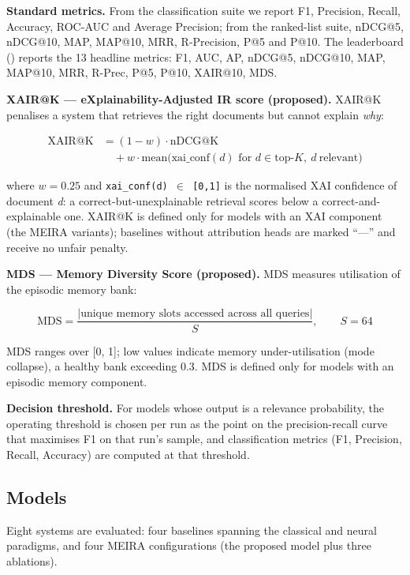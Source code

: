\textbf{Standard metrics.} From the classification suite we report F1, Precision, Recall, Accuracy, ROC-AUC and Average Precision; from the ranked-list suite, nDCG@5, nDCG@10, MAP, MAP@10, MRR, R-Precision, P@5 and P@10. The leaderboard () reports the 13 headline metrics: F1, AUC, AP, nDCG@5, nDCG@10, MAP, MAP@10, MRR, R-Prec, P@5, P@10, XAIR@10, MDS.

\textbf{XAIR@K --- eXplainability-Adjusted IR score (proposed).} XAIR@K penalises a system that retrieves the right documents but cannot explain \emph{why}:

\begin{align}\mathrm{XAIR@K} &= (1-w)\cdot\mathrm{nDCG@K} \nonumber\\&\quad + w\cdot\mathrm{mean}\bigl(\mathrm{xai\_conf}(d) \text{ for } d \in \mathrm{top}\text{-}K,\ d\ \text{relevant}\bigr)\end{align}

where \texttt{$w = 0.25$} and \texttt{xai\_conf(d) $\in$ [0,1]} is the normalised XAI confidence of document \emph{d}: a correct-but-unexplainable retrieval scores below a correct-and-explainable one. XAIR@K is defined only for models with an XAI component (the MEIRA variants); baselines without attribution heads are marked ``---'' and receive no unfair penalty.

\textbf{MDS --- Memory Diversity Score (proposed).} MDS measures utilisation of the episodic memory bank:

{\small \[ \mathrm{MDS} = \frac{|\text{unique memory slots accessed}\text{ across all queries}|}{S}, \qquad S = 64 \]}

MDS ranges over [0, 1]; low values indicate memory under-utilisation (mode collapse), a healthy bank exceeding 0.3. MDS is defined only for models with an episodic memory component.

\textbf{Decision threshold.} For models whose output is a relevance probability, the operating threshold is chosen per run as the point on the precision-recall curve that maximises F1 on that run's sample, and classification metrics (F1, Precision, Recall, Accuracy) are computed at that threshold.

\subsection{Models}
\label{sec:datasets-models}

Eight systems are evaluated: four baselines spanning the classical and neural paradigms, and four MEIRA configurations (the proposed model plus three ablations).

